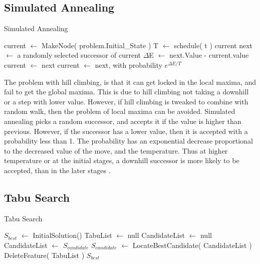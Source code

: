 \documentclass[12pt]{artikel3}                  %
\begin{document}
\subsection{Simulated Annealing}

\begin{algorithm}
  \caption{ Simulated Annealing }
  \begin{algorithmic}[1]
      \State current $\gets$ MakeNode( problem.Initial\_State )
        \State T $\gets$ schedule( t )
          \State \Return current
        \EndIf
        \State next $\gets$ a randomly selected successor of current
        \State $\Delta$E $\gets$ next.Value - current.value
          \State current $\gets$ next
        \Else
          \State current $\gets$ next, with probability $e^{\Delta E / T}$
        \EndIf
      \EndFor
    \EndFunction
  \end{algorithmic}
\end{algorithm}

The problem with hill climbing, is that it can get locked in the local maxima, and fail to get the global maxima.
This is due to hill climbing not taking a downhill or a step with lower value. However, if hill climbing is 
tweaked to combine with random walk, then the problem of local maxima can be avoided. Simulated annealing picks
a random successor, and accepts it if the value is higher than previous. However, if the successor has a lower
value, then it is accepted with a probability less than 1. The probability has an exponential decrease proportional
to the decreased value of the move, and the temperature. Thus at higher temperature or at the initial stages, a
downhill successor is more likely to be accepted, than in the later stages \cite{00033}.

\subsection{Tabu Search}

\begin{algorithm}[h]
  \caption{ Tabu Search \cite{00036}}
  \begin{algorithmic}[1]
      \State $S_{best}$ $\gets$ InitialSolution()
      \State TabuList $\gets$ null
        \State CandidateList $\gets$ null
            \State CandidateList $\gets$ $S_{candidate}$
          \EndIf
        \EndFor
        \State $S_{candidate}$ $\gets$ LocateBestCandidate( CandidateList )
            \State DeleteFeature( TabuList )
          \EndWhile
        \EndIf
      \EndWhile 
      \State \Return $S_{best}$
    \EndFunction
  \end{algorithmic}
\end{algorithm}
\end{document}
